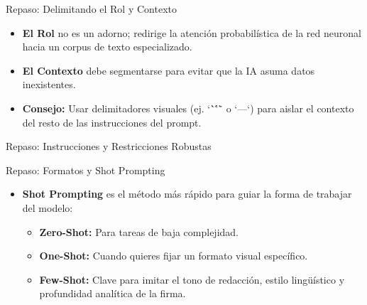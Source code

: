 \documentclass[aspectratio=169]{beamer}
\begin{document}
\begin{frame}[fragile]{Repaso: Delimitando el Rol y Contexto}


\begin{itemize}
  \item \textbf{El Rol} no es un adorno; redirige la atención probabilística de la red neuronal hacia un corpus de texto especializado.
  \item \textbf{El Contexto} debe segmentarse para evitar que la IA asuma datos inexistentes.
  \item \textbf{Consejo:} Usar delimitadores visuales (ej. `\``\''\"` o `---`) para aislar el contexto del resto de las instrucciones del prompt.
\end{itemize}
\end{frame}



\begin{frame}[fragile]{Repaso: Instrucciones y Restricciones Robustas}


\begin{table}
\end{table}


\end{frame}



\begin{frame}[fragile]{Repaso: Formatos y Shot Prompting}


\begin{itemize}
  \item \textbf{Shot Prompting} es el método más rápido para guiar la forma de trabajar del modelo:
  \begin{itemize}
    \item \textbf{Zero-Shot:} Para tareas de baja complejidad.
    \item \textbf{One-Shot:} Cuando quieres fijar un formato visual específico.
    \item \textbf{Few-Shot:} Clave para imitar el tono de redacción, estilo lingüístico y profundidad analítica de la firma.
  \end{itemize}
\end{itemize}
\end{frame}
\end{document}
